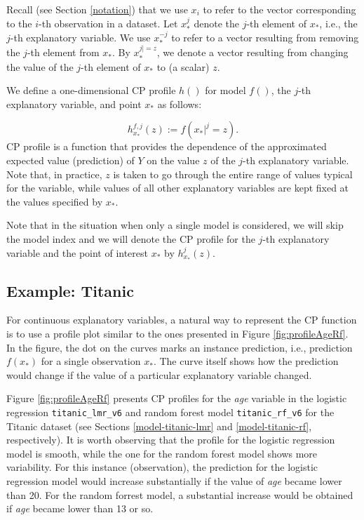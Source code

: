 \documentclass[12pt,]{krantz}
\begin{document}
Recall (see Section \ref{notation}) that we use \(x_i\) to refer to the vector corresponding to the \(i\)-th observation in a dataset. Let \(x^{j}_{*}\) denote the \(j\)-th element of \(x_{*}\), i.e., the \(j\)-th explanatory variable. We use \(x^{-j}_{*}\) to refer to a vector resulting from removing the \(j\)-th element from \(x_{*}\). By \(x^{j|=z}_{*}\), we denote a vector resulting from changing the value of the \(j\)-th element of \(x_{*}\) to (a scalar) \(z\).

We define a one-dimensional CP profile \(h()\) for model \(f()\), the \(j\)-th explanatory variable, and point \(x_*\) as follows:

\[
h^{f,j}_{x_*}(z) := f(x_*|^j=z).
\]
CP profile is a function that provides the dependence of the approximated expected value (prediction) of \(Y\) on the value \(z\) of the \(j\)-th explanatory variable. Note that, in practice, \(z\) is taken to go through the entire range of values typical for the variable, while values of all other explanatory variables are kept fixed at the values specified by \(x_*\).

Note that in the situation when only a single model is considered, we will skip the model index and we will denote the CP profile for the \(j\)-th explanatory variable and the point of interest \(x_*\) by \(h^{j}_{x_*}(z)\).

\hypertarget{CPExample}{%
\subsection{Example: Titanic}\label{CPExample}}

For continuous explanatory variables, a natural way to represent the CP function is to use a profile plot similar to the ones presented in Figure \ref{fig:profileAgeRf}. In the figure, the dot on the curves marks an instance prediction, i.e., prediction \(f(x_*)\) for a single observation \(x_*\). The curve itself shows how the prediction would change if the value of a particular explanatory variable changed.

Figure \ref{fig:profileAgeRf} presents CP profiles for the \emph{age} variable in the logistic regression \texttt{titanic\_lmr\_v6} and random forest model \texttt{titanic\_rf\_v6} for the Titanic dataset (see Sections \ref{model-titanic-lmr} and \ref{model-titanic-rf}, respectively). It is worth observing that the profile for the logistic regression model is smooth, while the one for the random forest model shows more variability. For this instance (observation), the prediction for the logistic regression model would increase substantially if the value of \emph{age} became lower than 20. For the random forrest model, a substantial increase would be obtained if \emph{age} became lower than 13 or so.
\end{document}
